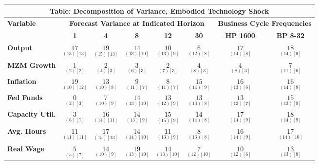 \documentclass{article}
\begin{document}
 
 \begin{tabular}{|l|c|@{}c|c|@{}c|c|@{}c|c|} 
 \hline 
 \multicolumn{8}{|c|}{\textbf{Table: Decomposition of Variance, Embodied Technology Shock}} \\ \hline 
 \textbf{Variable} & \multicolumn{5}{|c}{\textbf{Forecast Variance at 
 Indicated Horizon}} & \multicolumn{2}{|c|}{\textbf{Business Cycle 
 Frequencies}} \\ \cline{2-8} 
 & \textbf{1} & \textbf{4} & \textbf{8} & \textbf{12} & \textbf{30} & \textbf{%
 HP 1600} & \textbf{BP 8-32} \\ \hline\hline 
 \textbf{Output} & $\underset{( 13) [ 13]}{ 17}$ & $\underset{( 15) [ 13]}{ 19}$ & $\underset{( 13) [ 10]}{ 14}$ & $\underset{( 13) [  9]}{ 10}$ & $\underset{( 12) [  8]}{  6}$ & $\underset{( 14) [  8]}{ 17}$ & $\underset{( 14) [  9]}{ 18}$ \\ \hline 
 \textbf{MZM Growth} & $\underset{(  2) [  2]}{  1}$ & $\underset{(  4) [  3]}{  2}$ & $\underset{(  6) [  3]}{  3}$ & $\underset{(  7) [  3]}{  2}$ & $\underset{(  8) [  3]}{  4}$ & $\underset{(  8) [  3]}{  4}$ & $\underset{( 11) [  6]}{  7}$ \\ \hline 
 \textbf{Inflation} & $\underset{( 10) [ 12]}{ 19}$ & $\underset{( 10) [  8]}{ 13}$ & $\underset{( 11) [  7]}{  9}$ & $\underset{( 11) [  7]}{  8}$ & $\underset{( 14) [  9]}{ 15}$ & $\underset{( 13) [  6]}{ 16}$ & $\underset{( 14) [  8]}{ 16}$ \\ \hline 
 \textbf{Fed Funds} & $\underset{(  2) [  3]}{  0}$ & $\underset{( 10) [  9]}{  7}$ & $\underset{( 13) [ 10]}{ 14}$ & $\underset{( 12) [  9]}{ 13}$ & $\underset{( 13) [  8]}{ 13}$ & $\underset{( 12) [  7]}{ 13}$ & $\underset{( 13) [  9]}{ 15}$ \\ \hline 
 \textbf{Capacity Util.} & $\underset{(  6) [  7]}{  3}$ & $\underset{( 14) [ 11]}{ 16}$ & $\underset{( 13) [  9]}{ 14}$ & $\underset{( 15) [  9]}{ 15}$ & $\underset{( 14) [  8]}{ 14}$ & $\underset{( 14) [  9]}{ 17}$ & $\underset{( 14) [  9]}{ 18}$ \\ \hline 
 \textbf{Avg. Hours} & $\underset{( 11) [ 11]}{ 11}$ & $\underset{( 15) [ 13]}{ 17}$ & $\underset{( 14) [ 10]}{ 14}$ & $\underset{( 13) [  9]}{ 11}$ & $\underset{( 13) [  8]}{  8}$ & $\underset{( 14) [  9]}{ 16}$ & $\underset{( 14) [ 10]}{ 17}$ \\ \hline 
 \textbf{Real Wage} &  $\underset{(  5) [  7]}{  5}$ & $\underset{( 10) [  9]}{ 14}$ & $\underset{( 13) [ 10]}{ 19}$ & $\underset{( 13) [ 10]}{ 14}$ & $\underset{( 12) [ 10]}{  7}$ & $\underset{( 12) [  6]}{ 10}$ & $\underset{( 13) [  8]}{ 13}$ \\ \hline 

\end{tabular}
\end{document}
